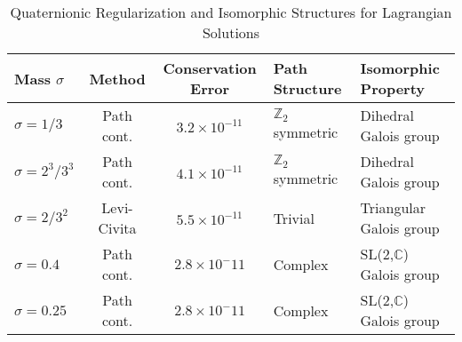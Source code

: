 \begin{table}[h]
\centering
\caption{Quaternionic Regularization and Isomorphic Structures for Lagrangian Solutions}
\label{tab:lagrangian_isomorphic}
\small
\begin{tabularx}{\textwidth}{lccXX}
\toprule
Mass $\sigma$ & Method & Conservation Error & Path Structure & Isomorphic Property \\
\midrule
$\sigma = 1/3$ & Path cont. & $3.2 \times 10^{-11}$ & $\mathbb{Z}_2$ symmetric & Dihedral Galois group \\
$\sigma = 2^3/3^3$ & Path cont. & $4.1 \times 10^{-11}$ & $\mathbb{Z}_2$ symmetric & Dihedral Galois group \\
$\sigma = 2/3^2$ & Levi-Civita & $5.5 \times 10^{-11}$ & Trivial & Triangular Galois group \\
$\sigma = 0.4$ & Path cont. & $2.8 \times 10^-11$ & Complex & SL(2,$\mathbb{C}$) Galois group \\
$\sigma = 0.25$ & Path cont. & $2.8 \times 10^-11$ & Complex & SL(2,$\mathbb{C}$) Galois group \\
\bottomrule
\end{tabularx}
\end{table}
